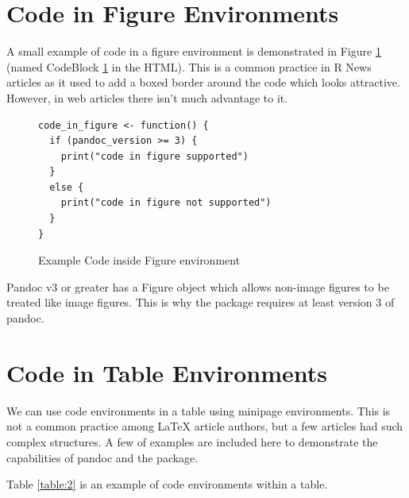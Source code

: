 \section{Code in Figure Environments}
A small example of code in a figure environment is demonstrated in Figure \ref{code:example} (named CodeBlock \ref{code:example} in the HTML). This is a common practice
in R News articles as it used to add a boxed border around the code which looks 
attractive. However, in web articles there isn't much advantage to it. 

\begin{figure}[htbp]
\begin{center}
\begin{verbatim}
code_in_figure <- function() {
  if (pandoc_version >= 3) {
    print("code in figure supported")
  }
  else {
    print("code in figure not supported")
  }
}
\end{verbatim}
\caption{ Example Code inside Figure environment}
\label{code:example}
\end{center}
\end{figure}

Pandoc v3 or greater \citep{pandoc} has a Figure object which allows non-image
figures to be treated like image figures. This is why the  package requires at least version 3 of pandoc.



\section{Code in Table Environments}
We can use code environments in a table using minipage environments. This is not
a common practice among LaTeX article authors, but a few articles had such complex
structures. A few of examples are included here to demonstrate the capabilities of pandoc and the  package. 

Table \ref{table:2} is an example of code environments within a table.

